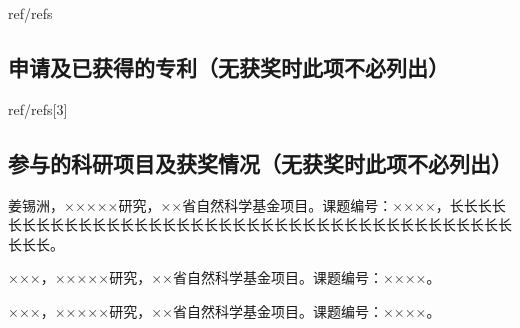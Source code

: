 \begin{resume}
  \begin{localref}{ref/refs}
    \nocite{zhangkun1994}
    \nocite{bixon1996dynamics}
  \end{localref}


  \subsection{申请及已获得的专利（无获奖时此项不必列出）}


  \begin{localref}{ref/refs}[3]
    \nocite{chenxu2020yejing}
    \nocite{jiangxizhou1980}
  \end{localref}

  \subsection{参与的科研项目及获奖情况（无获奖时此项不必列出）}
  \begin{achievements}[start=5]
    \item 姜锡洲，×××××研究，××省自然科学基金项目。课题编号：××××，长长长长长长长长长长长长长长长长长长长长长长长长长长长长长长长长长长长长长长长长长长长。
    \item ×××，×××××研究，××省自然科学基金项目。课题编号：××××。
    \item ×××，×××××研究，××省自然科学基金项目。课题编号：××××。
  \end{achievements}

\end{resume}
